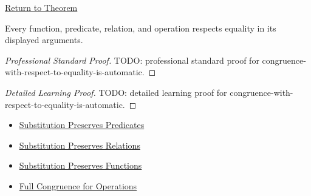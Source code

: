 \newpage
{}
\label{prf:congruence-with-respect-to-equality-is-automatic}

\begin{remark*}[Return]
\hyperref[prop:congruence-with-respect-to-equality-is-automatic]{Return to Theorem}
\end{remark*}

\begin{proposition*}
Every function, predicate, relation, and operation respects equality in its
displayed arguments.
\end{proposition*}

\begin{proof}[Professional Standard Proof]
\LRAProofBodyStart
TODO: professional standard proof for congruence-with-respect-to-equality-is-automatic.
\end{proof}

\begin{proof}[Detailed Learning Proof]
\LRAProofBodyStart
TODO: detailed learning proof for congruence-with-respect-to-equality-is-automatic.
\end{proof}

\begin{remark*}
\end{remark*}

\begin{dependencies}
\begin{itemize}
  \item \hyperref[prop:substitution-preserves-predicates]{Substitution Preserves Predicates}
  \item \hyperref[prop:substitution-preserves-relations-full]{Substitution Preserves Relations}
  \item \hyperref[prop:substitution-preserves-functions]{Substitution Preserves Functions}
  \item \hyperref[prop:substitution-preserves-operations-full]{Full Congruence for Operations}
\end{itemize}
\end{dependencies}

\clearpage
